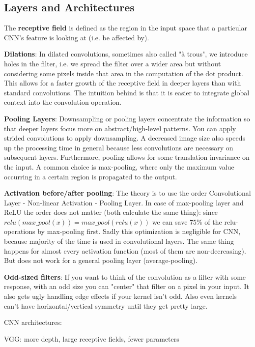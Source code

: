 \documentclass[12pt]{article}
\begin{document}
\subsection{Layers and Architectures}
\par The \textbf{receptive field} is defined as the region in the input space that a particular CNN’s feature is looking at (i.e. be affected by).
\par \textbf{Dilations}: In dilated convolutions, sometimes also called "à trous", we introduce holes in the filter, i.e. we spread the filter over a wider area but without considering some pixels inside that area in the computation of the dot product. This allows for a faster growth of the receptive field in deeper layers than with standard convolutions. The intuition behind is that it is easier to integrate global context into the convolution operation.
\par \textbf{Pooling Layers}: Downsampling or pooling layers concentrate the information so that deeper layers focus more on abstract/high-level patterns. You can apply strided convolutions to apply downsampling. A decreased image size also speeds up the processing time in general because less convolutions are necessary on subsequent layers. Furthermore, pooling allows for some translation invariance on the input. A common choice is max-pooling, where only the maximum value occurring in a certain region is propagated to the output.
\par \textbf{Activation before/after pooling}: The theory is to use the order Convolutional Layer - Non-linear Activation - Pooling Layer. In case of max-pooling layer and ReLU the order does not matter (both calculate the same thing): since $relu(max\_pool(x)) = max\_pool(relu(x))$ we can save 75\% of the relu-operations by max-pooling first. Sadly this optimization is negligible for CNN, because majority of the time is used in convolutional layers. The same thing happens for almost every activation function (most of them are non-decreasing). But does not work for a general pooling layer (average-pooling).
\par \textbf{Odd-sized filters}: If you want to think of the convolution as a filter with some response, with an odd size you can "center" that filter on a pixel in your input. It also gets ugly handling edge effects if your kernel isn't odd. Also even kernels can't have horizontal/vertical symmetry until they get pretty large.
\par CNN architectures:
\ulb
\item VGG: more depth, large receptive fields, fewer parameters
\end{document}
